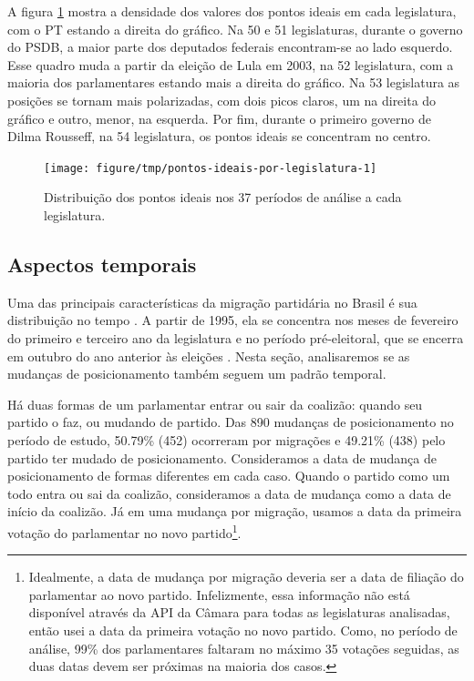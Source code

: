 \documentclass[a4paper,titlepage]{ppgi}\usepackage[]{graphicx}\usepackage[]{color}
\newenvironment{knitrout}{}{} %
\begin{document}
A figura \ref{fig:pontos-ideais-por-legislatura} mostra a densidade dos valores
dos pontos ideais em cada legislatura, com o PT estando a direita do gráfico.
Na 50\textordfeminine{} e 51\textordfeminine{} legislaturas, durante o governo
do PSDB, a maior parte dos deputados federais encontram-se ao lado esquerdo.
Esse quadro muda a partir da eleição de Lula em 2003, na 52\textordfeminine{}
legislatura, com a maioria dos parlamentares estando mais a direita do gráfico.
Na 53\textordfeminine{} legislatura as posições se tornam mais polarizadas, com
dois picos claros, um na direita do gráfico e outro, menor, na esquerda. Por
fim, durante o primeiro governo de Dilma Rousseff, na 54\textordfeminine{}
legislatura, os pontos ideais se concentram no centro.

\begin{knitrout}
\color{fgcolor}\begin{figure}
\texttt{[image: figure/tmp/pontos-ideais-por-legislatura-1]} \caption[Distribuição dos pontos ideais nos 37 períodos de análise a cada legislatura]{Distribuição dos pontos ideais nos 37 períodos de análise a cada legislatura.}\label{fig:pontos-ideais-por-legislatura}
\end{figure}


\end{knitrout}

\subsection{Aspectos temporais}
\label{cap:desenvolvimento:aspectos-temporais}



Uma das principais características da migração partidária no Brasil é sua
distribuição no tempo \cite{Araujo2000,Melo2004,Freitas2008}. A partir de 1995,
ela se concentra nos meses de fevereiro do primeiro e terceiro ano da
legislatura e no período pré-eleitoral, que se encerra em outubro do ano
anterior às eleições \cite{Freitas2008,Lei9504/1997}. Nesta seção,
analisaremos se as mudanças de posicionamento também seguem um padrão temporal.

Há duas formas de um parlamentar entrar ou sair da coalizão: quando seu partido
o faz, ou mudando de partido. Das 890 mudanças de
posicionamento no período de estudo,
50.79\% (452)
ocorreram por migrações e
49.21\% (438)
pelo partido ter mudado de posicionamento. Consideramos a data de mudança
de posicionamento de formas diferentes em cada caso. Quando o partido como um
todo entra ou sai da coalizão, consideramos a data de mudança como a data de
início da coalizão. Já em uma mudança por migração, usamos a data da primeira
votação do parlamentar no novo partido\footnote{Idealmente, a data de mudança
por migração deveria ser a data de filiação do parlamentar ao novo partido.
Infelizmente, essa informação não está disponível através da \gls{API} da
Câmara para todas as legislaturas analisadas, então usei a data da primeira
votação no novo partido. Como, no período de análise, 99\% dos parlamentares
faltaram no máximo 35 votações seguidas, as duas datas devem ser próximas na
maioria dos casos.}.
\end{document}
